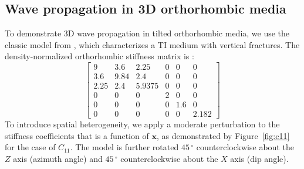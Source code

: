 \subsection{Wave propagation in 3D orthorhombic media}

To demonstrate 3D wave propagation in tilted orthorhombic media, we use the classic model from \cite{schoenberg97}, which characterizes a TI medium with vertical fractures. The density-normalized orthorhombic stiffness matrix is \cite[]{schoenberg97}:
\begin{equation}
\label{eq:orthmedia}
\left[ 
\begin{array}{cccccc}
  9    & 3.6  & 2.25   & 0 & 0   & 0 \\
  3.6  & 9.84 & 2.4    & 0 & 0   & 0 \\
  2.25 & 2.4  & 5.9375 & 0 & 0   & 0 \\
  0    & 0    & 0      & 2 & 0   & 0 \\
  0    & 0    & 0      & 0 & 1.6 & 0 \\
  0    & 0    & 0      & 0 & 0   & 2.182
\end{array} \right]
\end{equation}
To introduce spatial heterogeneity, we apply a moderate perturbation to the stiffness coefficients that is a function of $\mathbf{x}$, as demonstrated by Figure~\ref{fig:c11} for the case of $C_{11}$. The model is further rotated $45\,^{\circ}$ counterclockwise about the $Z$ axis (azimuth angle) and $45\,^{\circ}$ counterclockwise about the $X$ axis (dip angle).


